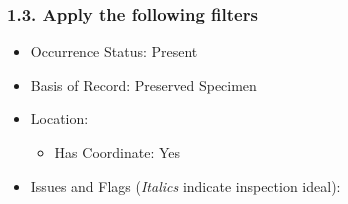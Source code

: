 \documentclass[
]{article}
\providecommand{\tightlist}{%
  \setlength{\itemsep}{0pt}\setlength{\parskip}{0pt}}
\begin{document}
\subsubsection{1.3. Apply the following
filters}\label{apply-the-following-filters}

\begin{itemize}
\tightlist
\item
  Occurrence Status: Present
\item
  Basis of Record: Preserved Specimen
\item
  Location:

  \begin{itemize}
  \tightlist
  \item
    Has Coordinate: Yes
  \end{itemize}
\item
  Issues and Flags (\emph{Italics} indicate inspection ideal):


\end{itemize}
\end{document}
